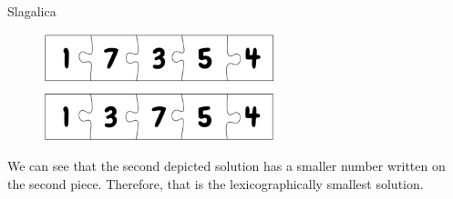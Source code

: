 \begin{statement}[
  problempoints=70,
  timelimit=1 second,
  memorylimit=512 MiB,
]{Slagalica}
\begin{figure}[H]
\centering
\includegraphics[width=0.6\textwidth]{img/sample_clarification.png}
\end{figure}
We can see that the second depicted solution has a smaller number written
on the second piece. Therefore, that is the lexicographically smallest solution.

\end{statement}

